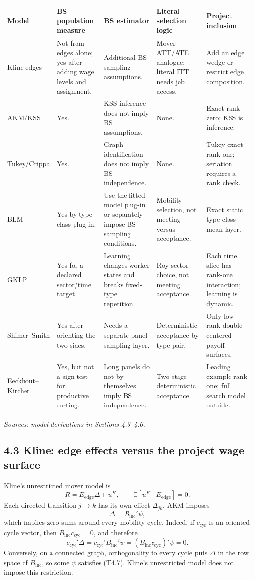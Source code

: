 \documentclass[11pt]{article}
\begin{document}
\begin{longtable}{p{}p{}p{}p{}p{}}
\textbf{Model} & \textbf{BS population measure} &
\textbf{BS estimator} & \textbf{Literal selection logic} &
\textbf{Project inclusion} \\
\hline
Kline edges & Not from edges alone; yes after adding wage levels and
assignment. & Additional BS sampling assumptions. & Mover ATT/ATE analogue;
literal ITT needs job access. & Add an edge wedge or restrict edge
composition. \\
AKM/KSS & Yes. & KSS inference does not imply BS assumptions. & None. &
Exact rank zero; KSS is inference. \\
Tukey/Crippa & Yes. & Graph identification does not imply BS independence. &
None. & Tukey exact rank one; seriation requires a rank check. \\
BLM & Yes by type-class plug-in. & Use the fitted-model plug-in or separately
impose BS sampling conditions. & Mobility selection, not meeting versus
acceptance. & Exact static type-class mean layer. \\
GKLP & Yes for a declared sector/time target. & Learning changes worker
states and breaks fixed-type repetition. & Roy sector choice, not meeting
acceptance. & Each time slice has rank-one interaction; learning is dynamic. \\
Shimer--Smith & Yes after orienting the two sides. & Needs a separate panel
sampling layer. & Deterministic acceptance by type pair. & Only low-rank
double-centered payoff surfaces. \\
Eeckhout--Kircher & Yes, but not a sign test for productive sorting. & Long
panels do not by themselves imply BS independence. & Two-stage deterministic
acceptance. & Leading example rank one; full search model outside. \\
\end{longtable}

\textit{Sources: model derivations in Sections 4.3--4.6.}

\subsection{4.3 Kline: edge effects versus the project wage surface}

Kline's unrestricted mover model is
\[
R=E_{\mathrm{edge}}\Delta+u^K,
\qquad
\mathbb E[u^K\mid E_{\mathrm{edge}}]=0.
\tag{T4.6}
\]
Each directed transition \(j\to k\) has its own effect \(\Delta_{jk}\).  AKM
imposes
\[
\Delta=B_{\mathrm{inc}}'\psi,
\tag{T4.7}
\]
which implies zero sums around every mobility cycle.  Indeed, if
\(c_{\mathrm{cyc}}\) is an oriented cycle vector, then
\(B_{\mathrm{inc}}c_{\mathrm{cyc}}=0\), and therefore
\[
c_{\mathrm{cyc}}'\Delta
=
c_{\mathrm{cyc}}'B_{\mathrm{inc}}'\psi
=
(B_{\mathrm{inc}}c_{\mathrm{cyc}})'\psi
=0.
\tag{T4.7a}
\]
Conversely, on a connected graph, orthogonality to every cycle puts
\(\Delta\) in the row space of \(B_{\mathrm{inc}}\), so some \(\psi\)
satisfies (T4.7).  Kline's unrestricted model does not impose this
restriction.
\end{document}

